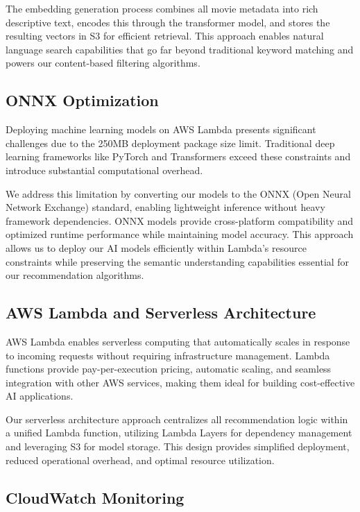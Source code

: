 \documentclass[conference]{IEEEtran}
\begin{document}
The embedding generation process combines all movie metadata into rich descriptive text, encodes this through the transformer model, and stores the resulting vectors in S3 for efficient retrieval. This approach enables natural language search capabilities that go far beyond traditional keyword matching and powers our content-based filtering algorithms.

\subsection{ONNX Optimization}

Deploying machine learning models on AWS Lambda presents significant challenges due to the 250MB deployment package size limit. Traditional deep learning frameworks like PyTorch and Transformers exceed these constraints and introduce substantial computational overhead.

We address this limitation by converting our models to the ONNX (Open Neural Network Exchange) standard, enabling lightweight inference without heavy framework dependencies. ONNX models provide cross-platform compatibility and optimized runtime performance while maintaining model accuracy. This approach allows us to deploy our AI models efficiently within Lambda's resource constraints while preserving the semantic understanding capabilities essential for our recommendation algorithms.

\subsection{AWS Lambda and Serverless Architecture}

AWS Lambda enables serverless computing that automatically scales in response to incoming requests without requiring infrastructure management. Lambda functions provide pay-per-execution pricing, automatic scaling, and seamless integration with other AWS services, making them ideal for building cost-effective AI applications.

Our serverless architecture approach centralizes all recommendation logic within a unified Lambda function, utilizing Lambda Layers for dependency management and leveraging S3 for model storage. This design provides simplified deployment, reduced operational overhead, and optimal resource utilization.

\subsection{CloudWatch Monitoring}
\end{document}
